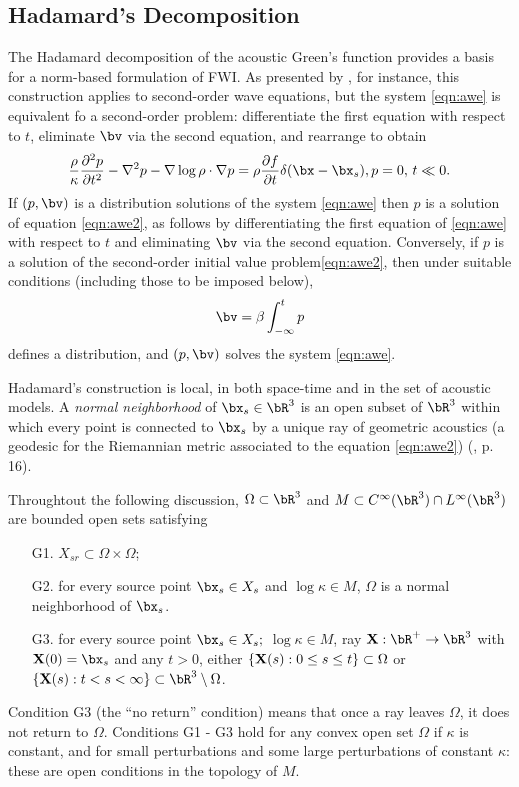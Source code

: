 \subsection{Hadamard's Decomposition}
The Hadamard decomposition of the acoustic Green's function \cite[]{Friedlander:75,Qian:JCP24} provides a
basis for a norm-based formulation of FWI. As presented by
\cite{Friedlander:75}, for instance, this construction applies to
second-order wave equations, but the system \ref{eqn:awe} is
equivalent fo a second-order problem: differentiate the first equation
with respect to $t$, eliminate $\bv$ via the second equation, and
rearrange to obtain
\begin{equation}
  \label{eqn:awe2}
  \frac{\rho}{\kappa}\frac{\partial^2 p}{\partial t^2} - \nabla^2 p -
  \nabla \log \rho \cdot \nabla p = \rho \frac{\partial f}{\partial t}
  \delta(\bx-\bx_s), \nonumber \\
  p=0, \, t \ll 0.
\end{equation}
If $(p,\bv)$ is a distribution solutions of the system
\ref{eqn:awe} then $p$ is a solution of equation
\ref{eqn:awe2}, as follows by differentiating the first equation of
\ref{eqn:awe} with respect to $t$ and eliminating $\bv$ via the second
equation. Conversely, if $p$ is a solution of the second-order initial
value problem\ref{eqn:awe2}, then under suitable conditions (including
those to be imposed below),
\[
  \bv = \beta \int_{-\infty}^t p
\]
defines a distribution, and $(p,\bv)$ solves the system \ref{eqn:awe}.

Hadamard's construction is local, in both space-time and in the set of
acoustic models. A {\em normal neighborhood} of
$\bx_s \in \bR^3$ is an open subset of $\bR^3$ 
within which every point is connected to $\bx_s$ by  a unique ray of
geometric acoustics (a geodesic for the Riemannian metric associated
to the equation \ref{eqn:awe2}) (\cite{Friedlander:75},
p. 16).

Throughtout the following discussion, $\Omega\subset \bR^3$ 
and $M \subset C^{\infty}(\bR^3) \cap L^{\infty}(\bR^3)$ are bounded open sets satisfying 
\begin{itemize}
  \item[G1. ] $X_{sr} \subset \Omega \times \Omega$;
  \item[G2. ] for every source point $\bx_s\in X_{s}$ and $\log \kappa \in M$, $\Omega$ is a
    normal neighborhood of $\bx_s$.
  \item[G3. ] for every source point $\bx_s \in X_{s};$
    $\log \kappa \in M$, ray ${\bf X}:\bR^+\rightarrow \bR^3$
    with ${\bf X}(0)=\bx_s$ and any $t>0$, either $\{{\bf X}(s): 0\le s \le t\} \subset \Omega$
    or $\{{\bf X}(s): t < s < \infty\} \subset \bR^3 \setminus \Omega$.
  \end{itemize}
Condition G3 (the ``no return'' condition) means that once a ray
leaves $\Omega$, it does not return to $\Omega$. Conditions G1 - G3
hold for any convex open set $\Omega$ if $\kappa$ is constant, and for small perturbations and some
large perturbations of constant $\kappa$: these are open conditions in
the topology of $M$.



